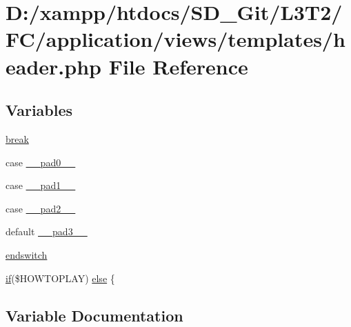 \hypertarget{application_2views_2templates_2header_8php}{}\section{D\+:/xampp/htdocs/\+S\+D\+\_\+\+Git/\+L3\+T2/\+F\+C/application/views/templates/header.php File Reference}
\label{application_2views_2templates_2header_8php}
\subsection*{Variables}
\begin{DoxyCompactItemize}
\item 
\hyperlink{application_2views_2templates_2header_8php_a91cf6fbebedd86150a36e5ac3d5d3bfc}{break}
\item 
case \hyperlink{application_2views_2templates_2header_8php_a32d4e07d06bb73a334918feffe29f946}{\+\_\+\+\_\+pad0\+\_\+\+\_\+}
\item 
case \hyperlink{application_2views_2templates_2header_8php_a0580bd55f19d2b72a1a95d51264aa4b6}{\+\_\+\+\_\+pad1\+\_\+\+\_\+}
\item 
case \hyperlink{application_2views_2templates_2header_8php_abe92b4cb0620171d6cf7ac6adf17d384}{\+\_\+\+\_\+pad2\+\_\+\+\_\+}
\item 
default \hyperlink{application_2views_2templates_2header_8php_a76c33ed6e732a032294a3b922d9271f2}{\+\_\+\+\_\+pad3\+\_\+\+\_\+}
\item 
\hyperlink{application_2views_2templates_2header_8php_a2a28576eff585b9b1eac1d15c127c957}{endswitch}
\item 
\hyperlink{_admin_2assets_2js_2bootstrap_8min_8js_a87cf461060832b8b68a7b48d9e371e4f}{if}(\$H\+O\+W\+T\+O\+P\+L\+A\+Y) \hyperlink{application_2views_2templates_2header_8php_a63f7e024b22f9c05a179d6f20da00b94}{else} \{
\end{DoxyCompactItemize}


\subsection{Variable Documentation}
\hypertarget{application_2views_2templates_2header_8php_a32d4e07d06bb73a334918feffe29f946}{}
